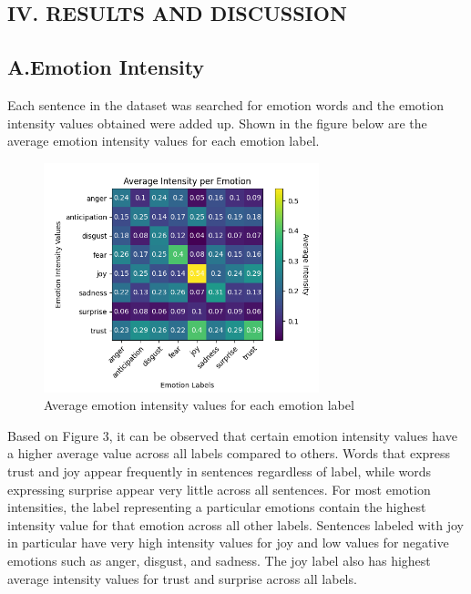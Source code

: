 \documentclass{icsthesis}
\begin{document}
\begin{mainmatter}
		\section{IV. RESULTS AND DISCUSSION}
			\subsection{A.\hspace{0.5cm}Emotion Intensity}
                Each sentence in the dataset was searched for emotion words and the emotion intensity values obtained were added up. Shown in the figure below are the average emotion intensity values for each emotion label.
                
                \begin{figure}[h!]
                    \centering
                    \includegraphics[width=8cm]{./images/avgint2.png}
                    \caption{Average emotion intensity values for each emotion label}
                    \label{fig:chart}
                \end{figure}
                
                Based on Figure 3, it can be observed that certain emotion intensity values have a higher average value across all labels compared to others. Words that express trust and joy appear frequently in sentences regardless of label, while words expressing surprise appear very little across all sentences. For most emotion intensities, the label representing a particular emotions contain the highest intensity value for that emotion across all other labels. Sentences labeled with joy in particular have very high intensity values for joy and low values for negative emotions such as anger, disgust, and sadness. The joy label also has highest average intensity values for trust and surprise across all labels.
                

\end{mainmatter}
\end{document}
